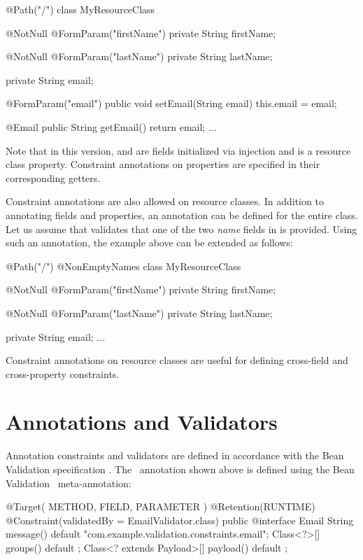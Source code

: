 \begin{listing}{1}
@Path("/")
class MyResourceClass {

  @NotNull @FormParam("firstName")
  private String firstName;

  @NotNull @FormParam("lastName")
  private String lastName;

  private String email;

  @FormParam("email")
  public void setEmail(String email) {
    this.email = email;
  }
  
  @Email
  public String getEmail() {
    return email;
  }
  ...
}
\end{listing}

Note that in this version,  and  are fields initialized via injection and  is a resource class property. Constraint annotations on properties are specified in their corresponding getters.

Constraint annotations are also allowed on resource classes. In addition to annotating fields and properties, an annotation can be defined for the entire class. Let us assume that  validates that one of the two \emph{name} fields in  is provided. Using such an annotation, the example above can be extended as follows:

\begin{listing}{1}
@Path("/")
@NonEmptyNames
class MyResourceClass {

  @NotNull @FormParam("firstName")
  private String firstName;

  @NotNull @FormParam("lastName")
  private String lastName;
  
  private String email;
  ...
}
\end{listing}

Constraint annotations on resource classes are useful for defining cross-field and cross-property constraints. 

\section{Annotations and Validators}

Annotation constraints and validators are defined in accordance with the Bean Validation specification \cite{bv11}. The \Email\ annotation shown above is defined using the Bean Validation \Constraint\ meta-annotation:

\begin{listing}{1}
@Target( { METHOD, FIELD, PARAMETER })
@Retention(RUNTIME)
@Constraint(validatedBy = EmailValidator.class)
public @interface Email {
  String message() default "{com.example.validation.constraints.email}"; 
  Class<?>[] groups() default {};
  Class<? extends Payload>[] payload() default {};
}
\end{listing}

